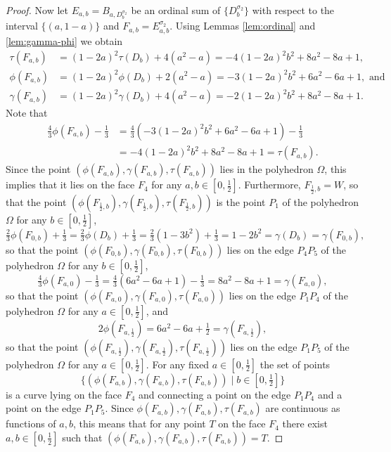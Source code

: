 \documentclass[12pt,a4paper]{amsart}
\theoremstyle{definition}
\begin{document}
\begin{proof}
Now let $E_{a,b} = B_{a,D_b^{\sigma_2}}$ be an ordinal sum of $\{D_b^{\sigma_2}\}$ with respect to the interval $\{(a, 1-a)\}$ and $F_{a,b} = E_{a,b}^{\sigma_2}$. Using Lemmas \ref{lem:ordinal} and \ref{lem:gamma-phi} we obtain
\begin{align*}
   \tau(F_{a,b}) &=  (1-2a)^2\tau(D_b) + 4(a^2 - a) = -4(1-2a)^2b^2 + 8a^2 - 8a + 1, \\
   \phi(F_{a,b}) &= (1-2a)^2\phi(D_b) + 2(a^2 - a) = -3(1-2a)^2b^2 + 6a^2 - 6a + 1, \text{ and} \\
   \gamma(F_{a,b}) &=  (1-2a)^2\gamma(D_b) + 4(a^2 - a) = -2(1-2a)^2b^2 + 8a^2 - 8a + 1.
\end{align*}
Note that 
\begin{align*}
  \tfrac43\phi(F_{a,b})-\tfrac13 &= \tfrac43(-3(1-2a)^2b^2 + 6a^2 - 6a + 1)-\tfrac13  \\
  &= -4(1-2a)^2b^2 + 8a^2 - 8a + 1 = \tau(F_{a,b}).
\end{align*}
Since the point $(\phi(F_{a,b}), \gamma(F_{a,b}), \tau(F_{a,b}))$ lies in the polyhedron $\Omega$, this implies that it lies on the face $F_4$ for any $a, b\in [0, \tfrac12]$.
Furthermore, $F_{\frac12,b} = W$, so that the point $(\phi(F_{\frac12,b}), \gamma(F_{\frac12,b}), \tau(F_{\frac12,b}))$ is the point $P_1$ of the polyhedron $\Omega$ for any $b\in [0, \tfrac12]$, 
$$   \tfrac23\phi(F_{0,b}) + \tfrac13  = \tfrac23\phi(D_b) + \tfrac13 = \tfrac23(1-3b^2) + \tfrac13 = 1-2b^2 = \gamma(D_b) = \gamma(F_{0,b}),$$
so that the point $(\phi(F_{0,b}), \gamma(F_{0,b}), \tau(F_{0,b}))$ lies on the edge $P_4P_5$ of the polyhedron $\Omega$ for any $b\in [0, \tfrac12]$, 
$$ \tfrac43\phi(F_{a,0}) - \tfrac13 = \tfrac43(6a^2 - 6a + 1) - \tfrac13 = 8a^2 - 8a + 1 = \gamma(F_{a,0}),$$
so that the point $(\phi(F_{a,0}), \gamma(F_{a,0}), \tau(F_{a,0}))$ lies on the edge $P_1P_4$ of the polyhedron $\Omega$ for any $a\in [0, \tfrac12]$, and
$$  2\phi(F_{a,\frac12})= 6a^2 - 6a + \tfrac12 = \gamma(F_{a,\frac12}),$$
so that the point $(\phi(F_{a,\frac12}), \gamma(F_{a,\frac12}), \tau(F_{a,\frac12}))$ lies on the edge $P_1P_5$ of the polyhedron $\Omega$ for any $a\in [0, \tfrac12]$. For any fixed $a\in [0, \tfrac12]$ the set of points 
$$\big\{(\phi(F_{a,b}), \gamma(F_{a,b}), \tau(F_{a,b})) \mid b\in [0, \tfrac12]\big\}$$ 
is a curve lying on the face $F_4$ and connecting a point on the edge $P_1P_4$ and a point on the edge $P_1P_5$. Since $\phi(F_{a,b}), \gamma(F_{a,b}), \tau(F_{a,b})$ are continuous as functions of $a,b$, this means that for any point $T$ on the face $F_4$ there exist $a,b\in [0, \tfrac12]$ such that $(\phi(F_{a,b}), \gamma(F_{a,b}), \tau(F_{a,b})) = T$.
\end{proof}
\end{document}
